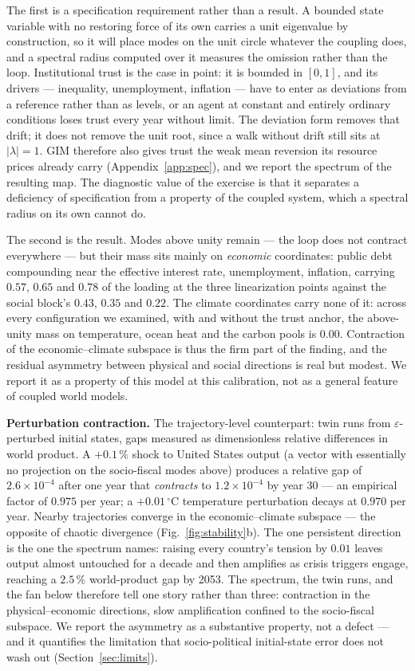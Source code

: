\documentclass[a4paper,fleqn]{cas-sc}
\begin{document}
The first is a specification requirement rather than a result. A bounded state variable with no
restoring force of its own carries a unit eigenvalue by construction, so it will place modes on
the unit circle whatever the coupling does, and a spectral radius computed over it measures the
omission rather than the loop. Institutional trust is the case in point: it is bounded in
$[0,1]$, and its drivers --- inequality, unemployment, inflation --- have to enter as deviations
from a reference rather than as levels, or an agent at constant and entirely ordinary conditions
loses trust every year without limit. The deviation form removes that drift; it does not remove
the unit root, since a walk without drift still sits at $|\lambda|=1$. GIM therefore also gives
trust the weak mean reversion its resource prices already carry (Appendix~\ref{app:spec}), and
we report the spectrum of the resulting map. The diagnostic value of the exercise is that it
separates a deficiency of specification from a property of the coupled system, which a spectral
radius on its own cannot do.

The second is the result. Modes above unity remain --- the loop does not contract everywhere ---
but their mass sits mainly on \emph{economic} coordinates: public debt compounding near the
effective interest rate, unemployment, inflation, carrying $0.57$, $0.65$ and $0.78$ of the
loading at the three linearization points against the social block's $0.43$, $0.35$ and $0.22$.
The climate coordinates carry none of it: across every configuration we examined, with and
without the trust anchor, the above-unity mass on temperature, ocean heat and the carbon pools
is $0.00$. Contraction of the economic--climate subspace is thus the firm part of the finding,
and the residual asymmetry between physical and social directions is real but modest. We report
it as a property of this model at this calibration, not as a general feature of coupled world
models.

\textbf{Perturbation contraction.} The trajectory-level counterpart: twin runs from
$\varepsilon$-perturbed initial states, gaps measured as dimensionless relative differences in
world product. A $+0.1\,\%$ shock to United States output (a vector with essentially no
projection on the socio-fiscal modes above) produces a relative gap of $2.6\times10^{-4}$ after
one year that \emph{contracts} to $1.2\times10^{-4}$ by year 30 --- an empirical factor of
$0.975$ per year; a $+0.01\,^{\circ}$C temperature perturbation decays at $0.970$ per year.
Nearby trajectories converge in the economic--climate subspace --- the opposite of chaotic
divergence (Fig.~\ref{fig:stability}b). The one persistent direction is the one the spectrum
names: raising every country's tension by $0.01$ leaves output almost untouched for a decade and
then amplifies as crisis triggers engage, reaching a $2.5\,\%$ world-product gap by 2053. The spectrum, the twin runs, and the fan below
therefore tell one story rather than three: contraction in the physical--economic directions,
slow amplification confined to the socio-fiscal subspace. We report the asymmetry as a
substantive property, not a defect --- and it quantifies the limitation that socio-political
initial-state error does not wash out (Section~\ref{sec:limits}).
\end{document}
